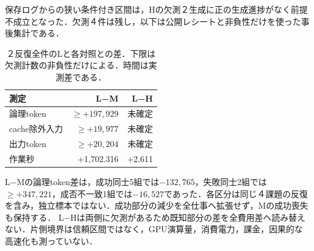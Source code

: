 保存ログからの狭い条件付き区間は，Hの欠測２生成に正の生成進捗がなく前提不成立となった．欠測４件は残し，以下は公開レシートと非負性だけを使った事後集計である．
\begin{table}[tb]
\centering\footnotesize\setlength{\tabcolsep}{3pt}
\caption{２反復全件のLと各対照との差．下限は欠測計数の非負性だけによる．時間は実測差である．}
\begin{tabular}{lrr}
測定 & L−M & L−H \\ \hline
論理token & $\geq +197,929$ & 未確定 \\
cache除外入力 & $\geq +19,977$ & 未確定 \\
出力token & $\geq +20,204$ & 未確定 \\
作業秒 & +1,702.316 & +2.611 \\
\hline\end{tabular}
\end{table}
L−Mの論理token差は，成功同士5組では$-132,765$，失敗同士2組では$\geq +347,221$，成否不一致1組では$-16,527$であった．各区分は同じ４課題の反復を含み，独立標本ではない．成功部分の減少を全仕事へ拡張せず，Mの成功喪失も保持する．
L−Hは両側に欠測があるため既知部分の差を全費用差へ読み替えない．片側境界は信頼区間ではなく，GPU演算量，消費電力，課金，因果的な高速化も測っていない．
